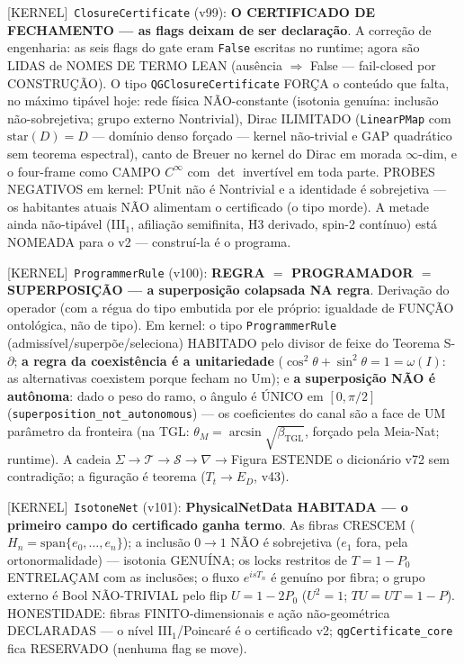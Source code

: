 \documentclass[11pt]{article}
\providecommand{\kernelmk}[1]{\textsf{[KERNEL]}~\texttt{#1}}\providecommand{\knownmk}[1]{\textsf{[KNOWN]}~{#1}}\providecommand{\statusmk}[1]{\textsf{[#1]}}
\newcommand{\bTGL}{\beta_{\mathrm{TGL}}}\newcommand{\Msun}{M_{\odot}}\newcommand{\TGL}{\mathrm{TGL}}
\theoremstyle{definition}\newtheorem{deriv}{Derivação}
\begin{document}
\kernelmk{ClosureCertificate} (v99): \textbf{O CERTIFICADO DE FECHAMENTO --- as flags deixam de ser declaração}. A correção de engenharia: as seis flags do gate eram \texttt{False} escritas no runtime; agora são LIDAS de NOMES DE TERMO LEAN (ausência $\Rightarrow$ False --- fail-closed por CONSTRUÇÃO). O tipo \texttt{QGClosureCertificate} FORÇA o conteúdo que falta, no máximo tipável hoje: rede física NÃO-constante (isotonia genuína: inclusão não-sobrejetiva; grupo externo Nontrivial), Dirac ILIMITADO (\texttt{LinearPMap} com $\mathrm{star}(D)=D$ --- domínio denso forçado --- kernel não-trivial e GAP quadrático sem teorema espectral), canto de Breuer no kernel do Dirac em morada $\infty$-dim, e o four-frame como CAMPO $C^\infty$ com $\det$ invertível em toda parte. PROBES NEGATIVOS em kernel: PUnit não é Nontrivial e a identidade é sobrejetiva --- os habitantes atuais NÃO alimentam o certificado (o tipo morde). A metade ainda não-tipável (III$_1$, afiliação semifinita, H3 derivado, spin-2 contínuo) está NOMEADA para o v2 --- construí-la é o programa.

\kernelmk{ProgrammerRule} (v100): \textbf{REGRA $=$ PROGRAMADOR $=$ SUPERPOSIÇÃO --- a superposição colapsada NA regra}. Derivação do operador (com a régua do tipo embutida por ele próprio: igualdade de FUNÇÃO ontológica, não de tipo). Em kernel: o tipo \texttt{ProgrammerRule} (admissível/superpõe/seleciona) HABITADO pelo divisor de feixe do Teorema S-$\partial$; \textbf{a regra da coexistência é a unitariedade} ($\cos^2\theta+\sin^2\theta=1=\omega(I)$: as alternativas coexistem porque fecham no Um); e \textbf{a superposição NÃO é autônoma}: dado o peso do ramo, o ângulo é ÚNICO em $[0,\pi/2]$ (\texttt{superposition\_not\_autonomous}) --- os coeficientes do canal são a face de UM parâmetro da fronteira (na TGL: $\theta_M=\arcsin\sqrt{\bTGL}$, forçado pela Meia-Nat; runtime). A cadeia $\Sigma\to\mathcal T\to\mathcal S\to\nabla\to$Figura ESTENDE o dicionário v72 sem contradição; a figuração é teorema ($T_t\to E_D$, v43).

\kernelmk{IsotoneNet} (v101): \textbf{PhysicalNetData HABITADA --- o primeiro campo do certificado ganha termo}. As fibras CRESCEM ($H_n=\mathrm{span}\{e_0,\dots,e_n\}$); a inclusão $0\to1$ NÃO é sobrejetiva ($e_1$ fora, pela ortonormalidade) --- isotonia GENUÍNA; os locks restritos de $T=1-P_0$ ENTRELAÇAM com as inclusões; o fluxo $e^{isT_n}$ é genuíno por fibra; o grupo externo é Bool NÃO-TRIVIAL pelo flip $U=1-2P_0$ ($U^2=1$; $TU=UT=1-P$). HONESTIDADE: fibras FINITO-dimensionais e ação não-geométrica DECLARADAS --- o nível III$_1$/Poincaré é o certificado v2; \texttt{qgCertificate\_core} fica RESERVADO (nenhuma flag se move).
\end{document}
